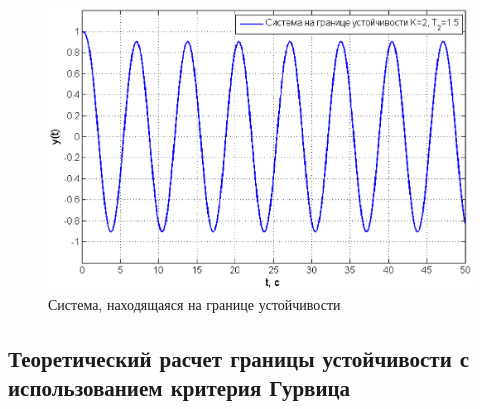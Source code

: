 \documentclass[12pt,a4paper]{article}
\begin{document}
\begin{figure}[H]
	\centering
	\includegraphics[width=1\linewidth]{na-gr.eps}
	\caption{Система, находящаяся на границе устойчивости}
\end{figure}

\newpage
\begin{center}
    \section{Теоретический расчет границы устойчивости с использованием критерия Гурвица}
\end{center}
 
\end{document}
